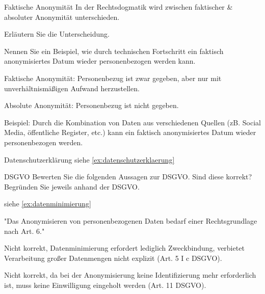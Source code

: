 \documentclass{exercisesheet}
\begin{document}
\begin{eexercises}{Faktische Anonymität}{
    In der Rechtsdogmatik wird zwischen faktischer \& absoluter Anonymität unterschieden.
  }
  \item Erläutern Sie die Unterscheidung.
  \item Nennen Sie ein Beispiel, wie durch technischen Fortschritt ein faktisch anonymisiertes Datum wieder personenbezogen werden kann.
\end{eexercises}

\begin{solutions}
  \item Faktische Anonymität: Personenbezug ist zwar gegeben, aber nur mit unverhältnismäßigen Aufwand herzustellen.\par Absolute Anonymität: Personenbezug ist nicht gegeben.
  \item Beispiel: Durch die Kombination von Daten aus verschiedenen Quellen (zB. Social Media, öffentliche Register, etc.) kann ein faktisch anonymisiertes Datum wieder personenbezogen werden.
\end{solutions}

\begin{exercise}{Datenschutzerklärung}
  siehe \ref{ex:datenschutzerklaerung}
\end{exercise}

\begin{eexercises}[2]{DSGVO}{
    Bewerten Sie die folgenden Aussagen zur DSGVO. Sind diese korrekt? Begründen Sie jeweils anhand der DSGVO.
  }
  \item siehe \ref{ex:datenminimierung}
  \item "Das Anonymisieren von personenbezogenen Daten bedarf einer Rechtsgrundlage nach Art. 6."
\end{eexercises}

\begin{solutions}
  \item Nicht korrekt, Datenminimierung erfordert lediglich Zweckbindung, verbietet Verarbeitung großer Datenmengen nicht explizit (Art. 5 I c DSGVO).
  \item Nicht korrekt, da bei der Anonymisierung keine Identifizierung mehr erforderlich ist, muss keine Einwilligung eingeholt werden (Art. 11 DSGVO).
\end{solutions}
\end{document}
